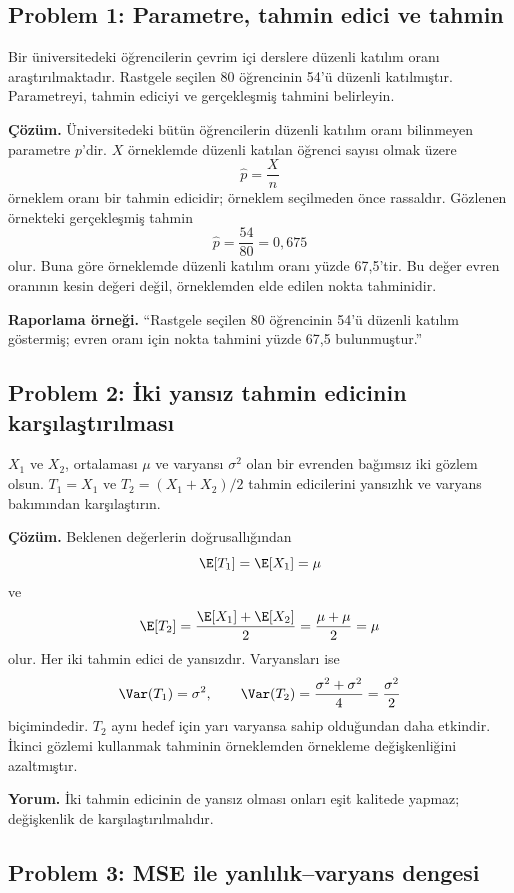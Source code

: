 \subsection*{Problem 1: Parametre, tahmin edici ve tahmin}

Bir üniversitedeki öğrencilerin çevrim içi derslere düzenli katılım oranı
araştırılmaktadır. Rastgele seçilen 80 öğrencinin 54'ü düzenli katılmıştır.
Parametreyi, tahmin ediciyi ve gerçekleşmiş tahmini belirleyin.

\textbf{Çözüm.} Üniversitedeki bütün öğrencilerin düzenli katılım oranı
bilinmeyen parametre $p$'dir. $X$ örneklemde düzenli katılan öğrenci sayısı
olmak üzere
\[
\hat p=\frac{X}{n}
\]
örneklem oranı bir tahmin edicidir; örneklem seçilmeden önce rassaldır.
Gözlenen örnekteki gerçekleşmiş tahmin
\[
\hat p=\frac{54}{80}=0{,}675
\]
olur. Buna göre örneklemde düzenli katılım oranı yüzde 67,5'tir. Bu değer
evren oranının kesin değeri değil, örneklemden elde edilen nokta tahminidir.

\textbf{Raporlama örneği.} ``Rastgele seçilen 80 öğrencinin 54'ü düzenli
katılım göstermiş; evren oranı için nokta tahmini yüzde 67,5 bulunmuştur.''

\subsection*{Problem 2: İki yansız tahmin edicinin karşılaştırılması}

$X_1$ ve $X_2$, ortalaması $\mu$ ve varyansı $\sigma^2$ olan bir evrenden
bağımsız iki gözlem olsun. $T_1=X_1$ ve
$T_2=(X_1+X_2)/2$ tahmin edicilerini yansızlık ve varyans bakımından
karşılaştırın.

\textbf{Çözüm.} Beklenen değerlerin doğrusallığından
\[
\E[T_1]=\E[X_1]=\mu
\]
ve
\[
\E[T_2]=\frac{\E[X_1]+\E[X_2]}{2}
=\frac{\mu+\mu}{2}=\mu
\]
olur. Her iki tahmin edici de yansızdır. Varyansları ise
\[
\Var(T_1)=\sigma^2,
\qquad
\Var(T_2)=\frac{\sigma^2+\sigma^2}{4}
=\frac{\sigma^2}{2}
\]
biçimindedir. $T_2$ aynı hedef için yarı varyansa sahip olduğundan daha
etkindir. İkinci gözlemi kullanmak tahminin örneklemden örnekleme
değişkenliğini azaltmıştır.

\textbf{Yorum.} İki tahmin edicinin de yansız olması onları eşit kalitede
yapmaz; değişkenlik de karşılaştırılmalıdır.

\subsection*{Problem 3: MSE ile yanlılık--varyans dengesi}

